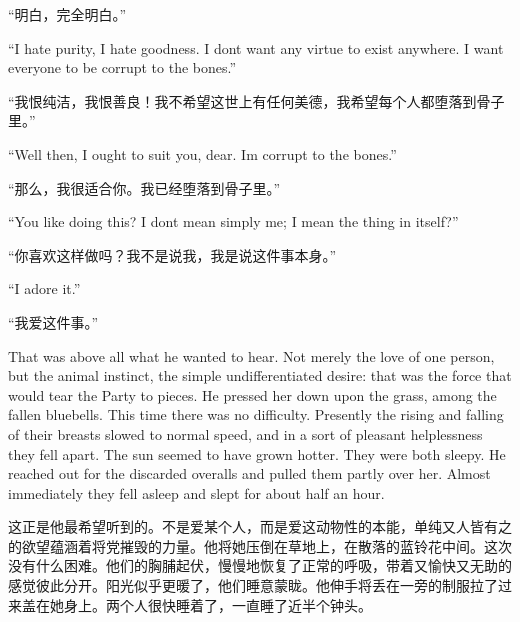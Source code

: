 \begin{paracol}{2}
\switchcolumn

``明白，完全明白。''

\switchcolumn*

``I hate purity, I hate goodness. I don\textquotesingle t want any virtue
to exist anywhere. I want everyone to be corrupt to the bones.''

\switchcolumn

``我恨纯洁，我恨善良！我不希望这世上有任何美德，我希望每个人都堕落到骨子里。''

\switchcolumn*

``Well then, I ought to suit you, dear. I\textquotesingle m corrupt to
the bones.''

\switchcolumn

``那么，我很适合你。我已经堕落到骨子里。''

\switchcolumn*

``You like doing this? I don\textquotesingle t mean simply me; I mean the
thing in itself?''

\switchcolumn

``你喜欢这样做吗？我不是说我，我是说这件事本身。''

\switchcolumn*

``I adore it.''

\switchcolumn

``我爱这件事。''

\switchcolumn*

That was above all what he wanted to hear. Not merely the love of one
person, but the animal instinct, the simple undifferentiated desire:
that was the force that would tear the Party to pieces. He pressed her
down upon the grass, among the fallen bluebells. This time there was no
difficulty. Presently the rising and falling of their breasts slowed to
normal speed, and in a sort of pleasant helplessness they fell apart.
The sun seemed to have grown hotter. They were both sleepy. He reached
out for the discarded overalls and pulled them partly over her. Almost
immediately they fell asleep and slept for about half an hour.

\switchcolumn

这正是他最希望听到的。不是爱某个人，而是爱这动物性的本能，单纯又人皆有之的欲望蕴涵着将党摧毁的力量。他将她压倒在草地上，在散落的蓝铃花中间。这次没有什么困难。他们的胸脯起伏，慢慢地恢复了正常的呼吸，带着又愉快又无助的感觉彼此分开。阳光似乎更暖了，他们睡意蒙眬。他伸手将丢在一旁的制服拉了过来盖在她身上。两个人很快睡着了，一直睡了近半个钟头。

\switchcolumn*


\end{paracol}
